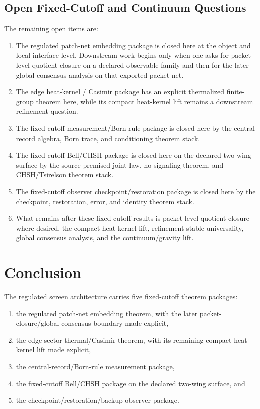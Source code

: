 \documentclass[11pt]{article}
\begin{document}
\subsection{Open Fixed-Cutoff and Continuum Questions}

The remaining open items are:
\begin{enumerate}[leftmargin=2em]
\item The regulated patch-net embedding package is closed here at the object and local-interface
level. Downstream work begins only when one asks for packet-level quotient closure on a declared
observable family and then for the later global consensus analysis on that exported packet net.
\item The edge heat-kernel / Casimir package has an explicit thermalized finite-group theorem
here, while its compact heat-kernel lift remains a downstream refinement question.
\item The fixed-cutoff measurement/Born-rule package is closed here by the central record
algebra, Born trace, and conditioning theorem stack.
\item The fixed-cutoff Bell/CHSH package is closed here on the declared two-wing surface by the
source-premised joint law, no-signaling theorem, and CHSH/Tsirelson theorem stack.
\item The fixed-cutoff observer checkpoint/restoration package is closed here by the
checkpoint, restoration, error, and identity theorem stack.
\item What remains after these fixed-cutoff results is packet-level quotient closure where
desired, the compact heat-kernel lift, refinement-stable universality, global consensus analysis,
and the continuum/gravity lift.
\end{enumerate}

\section{Conclusion}

The regulated screen architecture carries five fixed-cutoff theorem packages:
\begin{enumerate}[leftmargin=2em]
\item the regulated patch-net embedding theorem, with the later packet-closure/global-consensus boundary made explicit,
\item the edge-sector thermal/Casimir theorem, with its remaining compact heat-kernel lift made explicit,
\item the central-record/Born-rule measurement package,
\item the fixed-cutoff Bell/CHSH package on the declared two-wing surface, and
\item the checkpoint/restoration/backup observer package.
\end{enumerate}
\end{document}
